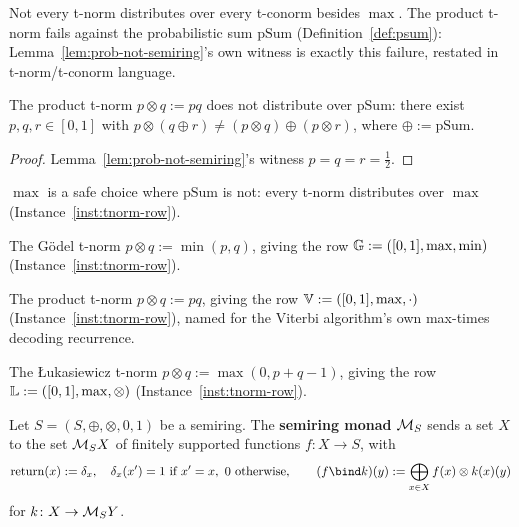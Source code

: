 Not every t-norm distributes over every t-conorm besides $\max$. The
product t-norm fails against the probabilistic sum $\mathrm{pSum}$
(Definition~\ref{def:psum}): Lemma~\ref{lem:prob-not-semiring}'s own
witness is exactly this failure, restated in t-norm/t-conorm language.

\begin{lemma}
\label{lem:product-not-distrib-psum}
\leanok
The product t-norm $p \otimes q := pq$ does not distribute over
$\mathrm{pSum}$: there exist $p,q,r \in [0,1]$ with $p \otimes (q \oplus
r) \ne (p \otimes q) \oplus (p \otimes r)$, where $\oplus :=
\mathrm{pSum}$.
\end{lemma}

\begin{proof}
\leanok
Lemma~\ref{lem:prob-not-semiring}'s witness $p=q=r=\tfrac12$.
\end{proof}

$\max$ is a safe choice where $\mathrm{pSum}$ is not: every t-norm
distributes over $\max$ (Instance~\ref{inst:tnorm-row}).

\begin{definition}
\label{inst:godel-latcsrng}
\leanok
The Gödel t-norm $p \otimes q := \min(p,q)$, giving the row
$\mathbb G := ([0,1], \max, \min)$ (Instance~\ref{inst:tnorm-row}).
\end{definition}

\begin{definition}
\label{inst:viterbi-latcsrng}
\leanok
The product t-norm $p \otimes q := pq$, giving the row
$\mathbb V := ([0,1], \max, \cdot)$ (Instance~\ref{inst:tnorm-row}),
named for the Viterbi algorithm's own max-times decoding recurrence.
\end{definition}

\begin{definition}
\label{inst:luk-latcsrng}
\leanok
The Łukasiewicz t-norm $p \otimes q := \max(0, p+q-1)$, giving the row
$\mathbb L := ([0,1], \max, \otimes)$ (Instance~\ref{inst:tnorm-row}).
\end{definition}

\begin{definition}
\label{def:semiring-monad}
\leanok
Let $S = (S,\oplus,\otimes,0,1)$ be a semiring. The \textbf{semiring
monad} $\mathcal M_{S}$ sends a set $X$ to the set $\mathcal M_{S}X$ of finitely
supported functions $f \colon X \to S$, with
\[
  \Ret(x) := \delta_x, \quad \delta_x(x')=1 \text{ if } x'=x,\ 0
  \text{ otherwise},
  \qquad
  (f \bind k)(y) := \bigoplus_{x \in X} f(x) \otimes k(x)(y)
\]
for $k \colon X \to \mathcal M_{S}Y$.
\end{definition}


